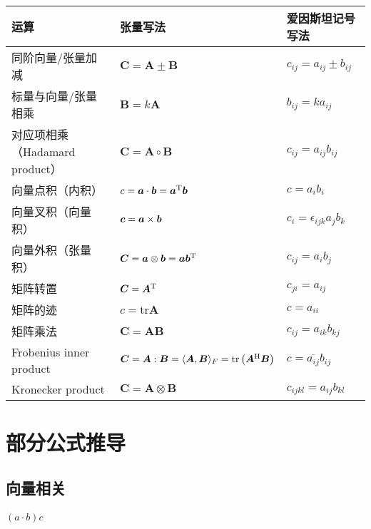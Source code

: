 \documentclass{article}
\begin{document}
\begin{longtable}[]{@{}lll@{}}
    \toprule
    运算                                & 张量写法                                      & 爱因斯坦记号写法\tabularnewline
    \midrule
    \endhead
    同阶向量/张量加减                   &
    ${\bm C} = {\bm A} \pm {\bm B}$     &
    $c_{ij} = a_{ij} \pm b_{ij}$\tabularnewline
    标量与向量/张量相乘                 & ${\bm B} = k {\bm A}$                         &
    $b_{ij} = k a_{ij}$\tabularnewline
    对应项相乘（Hadamard product）      &
    ${\bm C} = {\bm A} \circ {\bm B}$   &
    $c_{ij} = a_{ij} b_{ij}$\tabularnewline
    向量点积（内积）                    &
    $c = {\bm a} \cdot {\bm b} = {\bm a}^{\text T} {\bm b}$
                                        & $c = a_i b_i$\tabularnewline
    向量叉积（向量积）                  &
    ${\bm c} = {\bm a} \times {\bm b}$           &
    $c_i = \epsilon_{ijk} a_j b_k$\tabularnewline
    向量外积（张量积）                  &
    ${\bm C} = {\bm a} \otimes {\bm b}= {\bm a} {\bm b}^{\text T}$
                                        & $c_{ij} = a_i b_j$\tabularnewline
    矩阵转置                            & ${\bm C} = {\bm A}^{\text T}$                 &
    $c_{ji} = a_{ij}$\tabularnewline
    矩阵的迹                            & $c=\mathrm{tr} {\bm A}$                       &
    $c = a_{ii}$\tabularnewline
    矩阵乘法                            & ${\bm C} = {\bm A} {\bm B}$                   &
    $c_{ij} = a_{ik} b_{kj}$\tabularnewline
    Frobenius inner product             &
    ${\bm C} = {\bm A} : {\bm B}=\langle{\bm A}, {\bm B}\rangle_F = \mathrm{tr}\left( {\bm A}^{\text H} {\bm B} \right)$
                                        & $c = \overline{a_{ij}} b_{ij}$\tabularnewline
    Kronecker product                   &
    ${\bm C} = {\bm A} \otimes {\bm B}$ &
    $c_{ijkl} = a_{ij} b_{kl}$\tabularnewline
    \bottomrule
\end{longtable}

\section{部分公式推导}

\subsection{向量相关}

\paragraph{$(a\cdot b)c$}
\end{document}
